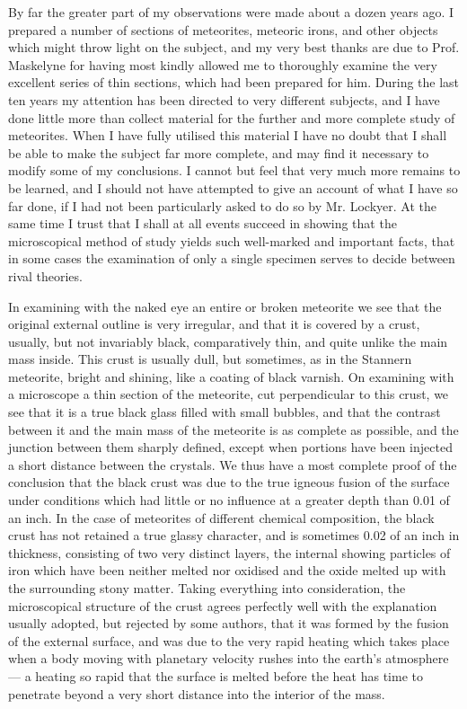 \documentclass[a4paper, 12pt, oneside]{article}
\begin{document}
By far the greater part of my observations were made about a dozen years ago. I prepared a number of sections of meteorites, meteoric irons, and other objects which might throw light on the subject, and my very best thanks are due to Prof. Maskelyne for having most kindly allowed me to thoroughly examine the very excellent series of thin sections, which had been prepared for him. During the last ten years my attention has been directed to very different subjects, and I have done little more than collect material for the further and more complete study of meteorites. When I have fully utilised this material I have no doubt that I shall be able to make the subject far more complete, and may find it necessary to modify some of my conclusions. I cannot but feel that very much more remains to be learned, and I should not have attempted to give an account of what I have so far done, if I had not been particularly asked to do so by Mr. Lockyer. At the same time I trust that I shall at all events succeed in showing that the microscopical method of study yields such well-marked and important facts, that in some cases the examination of only a single specimen serves to decide between rival theories.

In examining with the naked eye an entire or broken meteorite we see that the original external outline is very irregular, and that it is covered by a crust, usually, but not invariably black, comparatively thin, and quite unlike the main mass inside. This crust is usually dull, but sometimes, as in the Stannern meteorite, bright and shining, like a coating of black varnish. On examining with a microscope a thin section of the meteorite, cut perpendicular to this crust, we see that it is a true black glass filled with small bubbles, and that the contrast between it and the main mass of the meteorite is as complete as possible, and the junction between them sharply defined, except when portions have been injected a short distance between the crystals. We thus have a most complete proof of the conclusion that the black crust was due to the true igneous fusion of the surface under conditions which had little or no influence at a greater depth than 0.01 of an inch. In the case of meteorites of different chemical composition, the black crust has not retained a true glassy character, and is sometimes 0.02 of an inch in thickness, consisting of two very distinct layers, the internal showing particles of iron which have been neither melted nor oxidised and the oxide melted up with the surrounding stony matter. Taking everything into consideration, the microscopical structure of the crust agrees perfectly well with the explanation usually adopted, but rejected by some authors, that it was formed by the fusion of the external surface, and was due to the very rapid heating which takes place when a body moving with planetary velocity rushes into the earth's atmosphere --- a heating so rapid that the surface is melted before the heat has time to penetrate beyond a very short distance into the interior of the mass.
\end{document}
